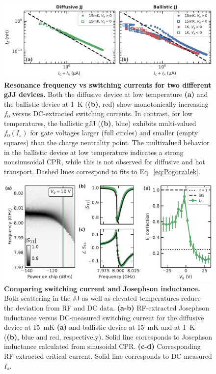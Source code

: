 \begin{figure}
	\centering
	\includegraphics[width=0.5\linewidth]{chapter-gJJ-CPR/figs/Figure2}
	\caption{
	\textbf{Resonance frequency vs switching currents for two different gJJ devices.}
	Both the diffusive device at low temperature \textbf{(a)} and the ballistic device at \SI{1}{\kelvin} (\textbf{(b)}, red) show monotonically increasing $f_0$ versus DC-extracted switching currents.
	In contrast, for low temperatures, the ballistic gJJ (\textbf{(b)}, blue) exhibits multi-valued $f_0(I_s)$ for gate voltages larger (full circles) and smaller (empty squares) than the charge neutrality point.
	The	multivalued behavior in the ballistic device at low temperature indicates a strong
nonsinusoidal CPR, while this is not observed for diffusive and hot
transport.
	Dashed lines correspond to fits to Eq.~\ref{eq:Pogorzalek}.}
	\label{fig:figure2}
\end{figure}
\begin{figure}
	\centering
	\includegraphics[width=0.833\linewidth]{chapter-gJJ-CPR/figs/Figure3}
	\caption{
	\textbf{Comparing switching current and Josephson inductance.}
	Both scattering in the JJ as well as elevated temperatures reduce the deviation from RF and DC data.
	\textbf{(a-b)} RF-extracted Josephson inductance versus DC-measured switching current for the diffusive device at
	\SI{15}{\milli\kelvin} \textbf{(a)} and ballistic device at \SI{15}{\milli\kelvin} and at \SI{1}{\kelvin} (\textbf{(b)}, blue and red, respectively).
	Solid line corresponds to Josephson inductance
calculated from sinusoidal CPR.
	\textbf{(c-d)} Corresponding RF-extracted critical current.
	Solid line corresponds to DC-measured $I_s$.}
	\label{fig:figure3}
\end{figure}
